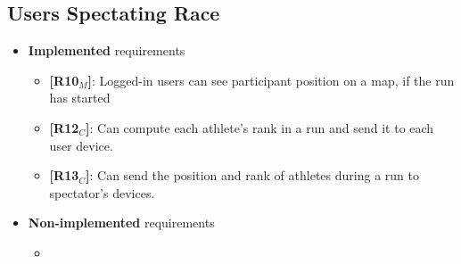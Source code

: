 \subsection{Users Spectating Race}
\begin{itemize}
    \item \textbf{Implemented} requirements
        \begin{itemize}
        
        
            \item \textbf{[R10$_M$]}: Logged-in users can see participant position on a map, if the run has started


    \item \textbf{[R12$_C$]}: Can compute each athlete's rank in a run and send it to each user device.
    \item \textbf{[R13$_C$]}: Can send the position and rank of athletes during a run to spectator's devices.


        \end{itemize}
    \item \textbf{Non-implemented} requirements
    \begin{itemize}
            \item 
        \end{itemize}
\end{itemize}
